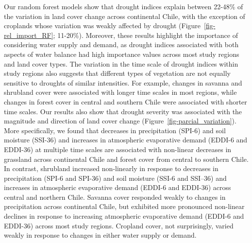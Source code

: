 \documentclass[
  sn-nature,
  numbered]{sn-jnl}
\begin{document}
Our random forest models show that drought indices explain between
22-48\% of the variation in land cover change across continental Chile,
with the exception of croplands whose variation was weakly affected by
drought (Figure~\ref{fig-rel_import_RF}; 11-20\%). Moreover, these
results highlight the importance of considering water supply and demand,
as drought indices associated with both aspects of water balance had
high importance values across most study regions and land cover types.
The variation in the time scale of drought indices within study regions
also suggests that different types of vegetation are not equally
sensitive to droughts of similar intensities. For example, changes in
savanna and shrubland cover were associated with longer time scales in
most regions, while changes in forest cover in central and southern
Chile were associated with shorter time scales. Our results also show
that drought severity was associated with the magnitude and direction of
land cover change (Figure~\ref{fig-parcial_variation}). More
specifically, we found that decreases in precipitation (SPI-6) and soil
moisture (SSI-36) and increases in atmospheric evaporative demand
(EDDI-6 and EDDI-36) at multiple time scales are associated with
non-linear decreases in grassland across continental Chile and forest
cover from central to southern Chile. In contrast, shrubland increased
non-linearly in response to decreases in precipitation (SPI-6 and
SPI-36) and soil moisture (SSI-6 and SSI--36) and increases in
atmospheric evaporative demand (EDDI-6 and EDDI-36) across central and
northern Chile. Savanna cover responded weakly to changes in
precipitation across continental Chile, but exhibited more pronounced
non-linear declines in response to increasing atmospheric evaporative
demand (EDDI-6 and EDDI-36) across most study regions. Cropland cover,
not surprisingly, varied weakly in response to changes in either water
supply or demand.
\end{document}
